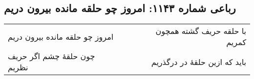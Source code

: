 \begin{center}
\section*{رباعی شماره ۱۱۴۳: امروز چو حلقه مانده بیرون دریم}
\label{sec:1143}
\begin{longtable}{l p{0.5cm} r}
امروز چو حلقه مانده بیرون دریم
&&
با حلقه حریف گشته همچون کمریم
\\
چون حلقهٔ چشم اگر حریف نظریم
&&
باید که ازین حلقهٔ در درگذریم
\\
\end{longtable}
\end{center}
